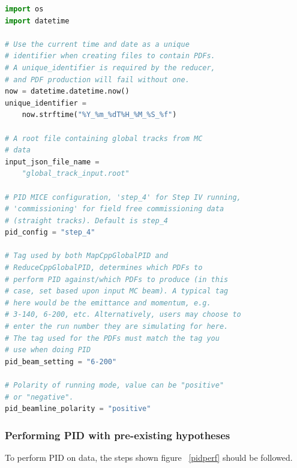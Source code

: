 \vspace*{1\baselineskip}

\begin{lstlisting}[language=Python,basicstyle=\ttfamily,frame=single,captionpos=b,caption={An example datacard (pdf\_example\_datacard.py) for use with pid\_pdf\_generator.py},label=pdfdatacard]
import os
import datetime

# Use the current time and date as a unique
# identifier when creating files to contain PDFs. 
# A unique_identifier is required by the reducer, 
# and PDF production will fail without one.
now = datetime.datetime.now()
unique_identifier = 
	now.strftime("%Y_%m_%dT%H_%M_%S_%f")

# A root file containing global tracks from MC
# data
input_json_file_name = 
	"global_track_input.root"

# PID MICE configuration, 'step_4' for Step IV running,
# 'commissioning' for field free commissioning data
# (straight tracks). Default is step_4
pid_config = "step_4"

# Tag used by both MapCppGlobalPID and
# ReduceCppGlobalPID, determines which PDFs to
# perform PID against/which PDFs to produce (in this
# case, set based upon input MC beam). A typical tag
# here would be the emittance and momentum, e.g.
# 3-140, 6-200, etc. Alternatively, users may choose to
# enter the run number they are simulating for here.
# The tag used for the PDFs must match the tag you
# use when doing PID
pid_beam_setting = "6-200"

# Polarity of running mode, value can be "positive"
# or "negative".
pid_beamline_polarity = "positive"

\end{lstlisting}


\vspace*{2\baselineskip}


\subsubsection{Performing PID with pre-existing hypotheses}
\label{perf}
To perform PID on data, the steps shown figure ~\ref{pidperf} should be followed.

